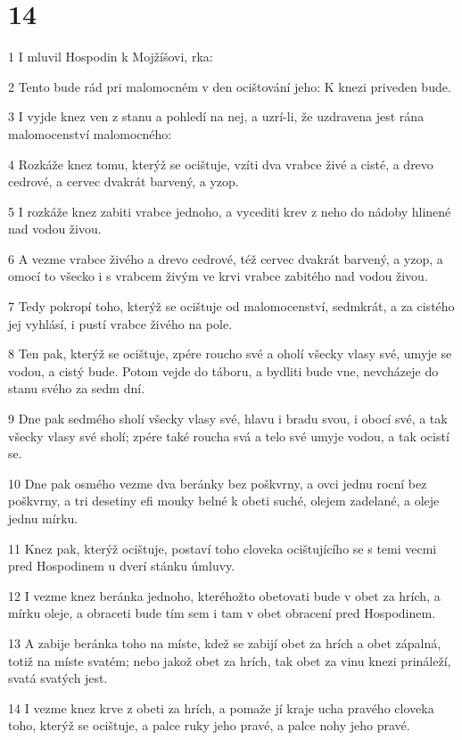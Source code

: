 \chapter{14}

\par 1 I mluvil Hospodin k Mojžíšovi, rka:
\par 2 Tento bude rád pri malomocném v den ocištování jeho: K knezi priveden bude.
\par 3 I vyjde knez ven z stanu a pohledí na nej, a uzrí-li, že uzdravena jest rána malomocenství malomocného:
\par 4 Rozkáže knez tomu, kterýž se ocištuje, vzíti dva vrabce živé a cisté, a drevo cedrové, a cervec dvakrát barvený, a yzop.
\par 5 I rozkáže knez zabiti vrabce jednoho, a vycediti krev z neho do nádoby hlinené nad vodou živou.
\par 6 A vezme vrabce živého a drevo cedrové, též cervec dvakrát barvený, a yzop, a omocí to všecko i s vrabcem živým ve krvi vrabce zabitého nad vodou živou.
\par 7 Tedy pokropí toho, kterýž se ocištuje od malomocenství, sedmkrát, a za cistého jej vyhlásí, i pustí vrabce živého na pole.
\par 8 Ten pak, kterýž se ocištuje, zpére roucho své a oholí všecky vlasy své, umyje se vodou, a cistý bude. Potom vejde do táboru, a bydliti bude vne, nevcházeje do stanu svého za sedm dní.
\par 9 Dne pak sedmého sholí všecky vlasy své, hlavu i bradu svou, i obocí své, a tak všecky vlasy své sholí; zpére také roucha svá a telo své umyje vodou, a tak ocistí se.
\par 10 Dne pak osmého vezme dva beránky bez poškvrny, a ovci jednu rocní bez poškvrny, a tri desetiny efi mouky belné k obeti suché, olejem zadelané, a oleje jednu mírku.
\par 11 Knez pak, kterýž ocištuje, postaví toho cloveka ocištujícího se s temi vecmi pred Hospodinem u dverí stánku úmluvy.
\par 12 I vezme knez beránka jednoho, kteréhožto obetovati bude v obet za hrích, a mírku oleje, a obraceti bude tím sem i tam v obet obracení pred Hospodinem.
\par 13 A zabije beránka toho na míste, kdež se zabijí obet za hrích a obet zápalná, totiž na míste svatém; nebo jakož obet za hrích, tak obet za vinu knezi prináleží, svatá svatých jest.
\par 14 I vezme knez krve z obeti za hrích, a pomaže jí kraje ucha pravého cloveka toho, kterýž se ocištuje, a palce ruky jeho pravé, a palce nohy jeho pravé.
